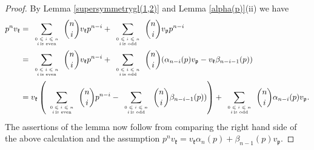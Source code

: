 \documentclass[11pt]{amsart}
\begin{document}
\begin{proof}
 By Lemma \ref{supersymmetrygl(1,2)} and Lemma \ref{alpha(p)}(ii) we have
\begin{align*}
p^nv_{\mathfrak k}&
= \sum_{\tiny
\begin{array}{cc}
0\leqslant i\leqslant n\\
i \, \text{is even}
\end{array}}{n \choose i}
v_{\mathfrak k}
p^{n-i}+ \sum_{\tiny
\begin{array}{cc}
0\leqslant i\leqslant n\\
i \, \text{is odd}
\end{array}}{n \choose i}v_{\mathfrak p}p^{n-i}\\
&=\sum_{\tiny
\begin{array}{cc}
0\leqslant i\leqslant n\\
i \, \text{is even}
\end{array}}{n \choose i}
v_{\mathfrak k} 
p^{n-i}+ \sum_{\tiny
\begin{array}{cc}
0\leqslant i\leqslant n\\
i \, \text{is odd}
\end{array}}{n \choose i}(\alpha_{n-i}(p)v_{\mathfrak p}-v_{\mathfrak k}\beta_{n-i-1}(p))\\
&=v_{\mathfrak k} \left( \sum_{\tiny
\begin{array}{cc}
0\leqslant i\leqslant n\\
i \, \text{is even}
\end{array}}{n \choose i}p^{n-i}-\sum_{\tiny
\begin{array}{cc}
0\leqslant i\leqslant n\\
i \, \text{is odd}
\end{array}}{n \choose i}\beta_{n-i-1}(p))\right)+
\sum_{\tiny
\begin{array}{cc}
0\leqslant i\leqslant n\\
i \, \text{is odd}
\end{array}}{n \choose i}\alpha_{n-i}(p)v_{\mathfrak p}.
\end{align*}
The assertions of the lemma now follow from comparing the right hand side of the above calculation and the assumption $p^nv_{\mathfrak k}=v_{\mathfrak k}\alpha_{n}(p)+\beta_{n-1}(p)v_{\mathfrak p}$.
\end{proof}
\end{document}
